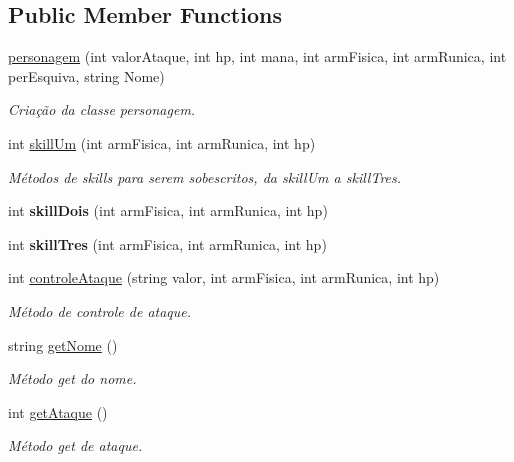 \subsection*{Public Member Functions}
\begin{DoxyCompactItemize}
\item 
\mbox{\hyperlink{classpersonagem_ab07283c6d509230657835ef6ceed411d}{personagem}} (int valor\+Ataque, int hp, int mana, int arm\+Fisica, int arm\+Runica, int per\+Esquiva, string Nome)
\begin{DoxyCompactList}\small\item\em Criação da classe personagem. \end{DoxyCompactList}\item 
int \mbox{\hyperlink{classpersonagem_a6df830166e074493fe0a25502ec24d4d}{skill\+Um}} (int arm\+Fisica, int arm\+Runica, int hp)
\begin{DoxyCompactList}\small\item\em Métodos de skills para serem sobescritos, da skill\+Um a skill\+Tres. \end{DoxyCompactList}\item 
\mbox{\label{classpersonagem_aaa7cac0258a6e6e42c1b1d17ecbf3139}} 
int {\bfseries skill\+Dois} (int arm\+Fisica, int arm\+Runica, int hp)
\item 
\mbox{\label{classpersonagem_a015143bbe13eca5865f6e7eca45407cb}} 
int {\bfseries skill\+Tres} (int arm\+Fisica, int arm\+Runica, int hp)
\item 
int \mbox{\hyperlink{classpersonagem_a31e7891af5a68142e7dc693d894069f1}{controle\+Ataque}} (string valor, int arm\+Fisica, int arm\+Runica, int hp)
\begin{DoxyCompactList}\small\item\em Método de controle de ataque. \end{DoxyCompactList}\item 
string \mbox{\hyperlink{classpersonagem_a9b58d2e434e2fbc15786ce24bdf593ec}{get\+Nome}} ()
\begin{DoxyCompactList}\small\item\em Método get do nome. \end{DoxyCompactList}\item 
int \mbox{\hyperlink{classpersonagem_a70a912dec9dcdedffa208fb3a709fa57}{get\+Ataque}} ()
\begin{DoxyCompactList}\small\item\em Método get de ataque. \end{DoxyCompactList}\item 

\end{DoxyCompactItemize}
